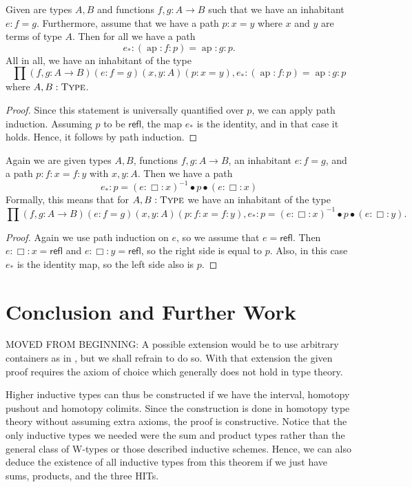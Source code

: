 \documentclass[a4paper,UKenglish]{lipics-v2016}
\newcommand{\Boperator}[1]{\mathsf{#1}}
\newcommand{\fpath}[0]{: \Box :}
\newcommand{\conc}[0]{\bullet}
\newcommand{\ap}[0]{\operatorname{ap}}
\newcommand{\refl}[0]{\Boperator{refl}}
\newcommand{\Type}[0]{\operatorname{\textsc{Type}}}
\begin{document}
\begin{lemma}
\label{lem:pathext}
Given are types $A, B$ and functions $f, g : A \rightarrow B$ such that we have an inhabitant $e : f = g$.
Furthermore, assume that we have a path $p : x = y$ where $x$ and $y$ are terms of type $A$.
Then for all we have a path
\[
e_* : (\ap : f : p) = \ap : g : p.
\]
All in all, we have an inhabitant of the type
\[
\prod (f, g : A \rightarrow B) (e : f = g) (x, y : A) (p : x = y), e_* : (\ap : f : p) = \ap : g : p
\]
where $A, B : \Type$.
\end{lemma}

\begin{proof}
Since this statement is universally quantified over $p$, we can apply path induction.
Assuming $p$ to be $\refl$, the map $e_*$ is the identity, and in that case it holds.
Hence, it follows by path induction.
\end{proof}

\begin{lemma}
\label{lem:funTrans}
Again we are given types $A, B$, functions $f, g : A \rightarrow B$, an inhabitant $e : f = g$, and a path $p : f : x = f : y$ with $x, y : A$.
Then we have a path 
\[
e_* : p = (e \fpath x)^{-1} \conc p \conc (e \fpath x)
\]
Formally, this means that for $A, B : \Type$ we have an inhabitant of the type
\[
\prod (f, g : A \rightarrow B) (e : f = g) (x, y : A) (p : f : x = f : y), e_* : p = (e \fpath x)^{-1} \conc p \conc (e \fpath y).
\]
\end{lemma}

\begin{proof}
Again we use path induction on $e$, so we assume that $e = \refl$.
Then $e \fpath x = \refl$ and $e \fpath y = \refl$, so the right side is equal to $p$.
Also, in this case $e_*$ is the identity map, so the left side also is $p$.
\end{proof}

\section{Conclusion and Further Work}

MOVED FROM BEGINNING: A possible extension would be to use arbitrary containers as in \cite{abbott2005containers}, but we shall refrain to do so.
With that extension the given proof requires the axiom of choice which generally does not hold in type theory.


Higher inductive types can thus be constructed if we have the interval, homotopy pushout and homotopy colimits.
Since the construction is done in homotopy type theory without assuming extra axioms, the proof is constructive.
Notice that the only inductive types we needed were the sum and product types rather than the general class of W-types or those described inductive schemes.
Hence, we can also deduce the existence of all inductive types from this theorem if we just have sums, products, and the three HITs. 
\end{document}
